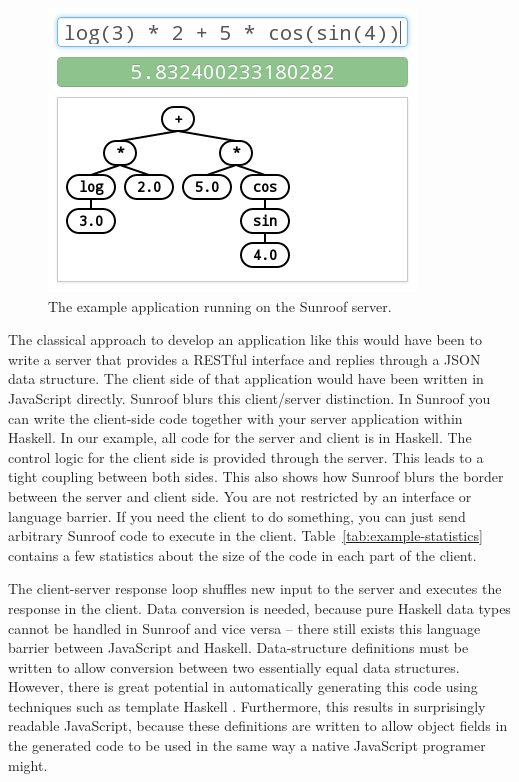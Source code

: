 \documentclass{llncs}
\newcommand{\TabRef}[1]{Table~\ref{#1}}
\begin{document}
\begin{figure}[t]%
\begin{center}%
\includegraphics[scale=0.5]{figures/example-application.png}%
\end{center}%
\caption{The example application running on the Sunroof server.}%
\label{fig:example-application}
\end{figure}


The classical approach to develop an application like this would have 
been to write a server that provides a RESTful interface and replies 
through a JSON data structure. 
The client side of that application would have been written in JavaScript
directly.
Sunroof blurs this client/server distinction.
In Sunroof you can write the client-side code together with
your server application within Haskell. In our example, all code 
for the server and client is in Haskell. The control logic 
for the client side is provided through the server.
This leads to a tight coupling between both sides. 
This also shows how Sunroof blurs the border between the server 
and client side. You are not restricted by an interface or language 
barrier. If you need the client to do something, you can just 
send arbitrary Sunroof code to execute in the client.
%
\TabRef{tab:example-statistics} contains a few statistics 
about the size of the code in each part of the client.

The client-server response loop shuffles new input to the server 
and executes the response in the client.
%
Data conversion is needed, because pure Haskell data types
cannot be handled in Sunroof and vice versa -- there still
exists this language barrier between JavaScript and Haskell. 
Data-structure definitions must be written
to allow conversion between two essentially equal data structures.
However, there is great potential in automatically 
generating this code using techniques such as template Haskell
\cite{Sheard:02:TemplateMetaProgrammingHaskell}.
Furthermore, this results in surprisingly readable JavaScript,
because these definitions are written to allow object fields
in the generated code to be used in the same way a native JavaScript
programer might.
\end{document}
